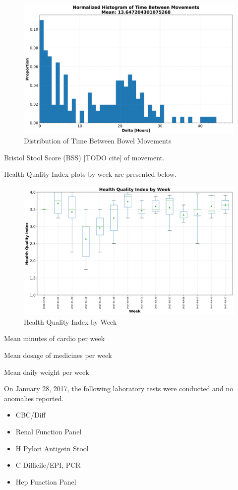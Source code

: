 \documentclass[conference]{IEEEtran}
\begin{document}
\begin{figure}[t]
    \centering
    \includegraphics[width=\columnwidth]{time_between_movements.png}
    \caption{Distribution of Time Between Bowel Movements}\label{fig:time_between_movements}
\end{figure}


Bristol Stool Score (BSS) [TODO cite] of movement.

Health Quality Index plots by week are presented below.

\begin{figure}[t]
    \centering
    \includegraphics[width=\columnwidth]{hqi_box.png}
    \caption{Health Quality Index by Week}\label{fig:hqi}
\end{figure}

Mean minutes of cardio per week

Mean dosage of medicines per week

Mean daily weight per week

On January 28, 2017, the following laboratory tests were conducted and no anomalies reported.
\begin{itemize}[noitemsep]
\item CBC/Diff
\item Renal Function Panel
\item H Pylori Antigetn Stool
\item C Difficile/EPI, PCR
\item Hep Function Panel
\end{itemize}
\end{document}
